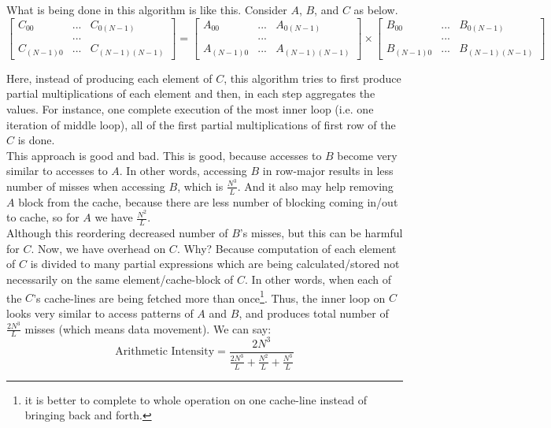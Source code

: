 \documentclass[paper=a4, fontsize=11pt]{scrartcl} %
\numberwithin{equation}{section} %
\numberwithin{figure}{section} %
\numberwithin{table}{section} %
\begin{document}
What is being done in this algorithm is like this. Consider $A$, $B$, and $C$ as below.
\begin{equation*}
\begin{bmatrix}
C_{00} & ... & C_{0(N-1)} \\
 &...&\\
C_{(N-1)0} & ... & C_{(N-1)(N-1)}
\end{bmatrix} = 
\begin{bmatrix}
A_{00} & ... & A_{0(N-1)} \\
 &...&\\
A_{(N-1)0} & ... & A_{(N-1)(N-1)}
\end{bmatrix} \times
\begin{bmatrix}
B_{00} & ... & B_{0(N-1)} \\
 &...&\\
B_{(N-1)0} & ... & B_{(N-1)(N-1)}
\end{bmatrix}
\end{equation*}

Here, instead of producing each element of $C$, this algorithm tries to first produce partial multiplications of each element and then, in each step aggregates the values. For instance, one complete execution of the most inner loop (i.e. one iteration of middle loop), all of the first partial multiplications of first row of the $C$ is done.\\
This approach is good and bad. This is good, because accesses to $B$ become very similar to accesses to $A$. In other words, accessing $B$ in row-major results in less number of misses when accessing $B$, which is $\frac{N^{3}}{L}$. And it also may help removing $A$ block from the cache, because there are less number of blocking coming in/out to cache, so for $A$ we have $\frac{N^{2}}{L}$.\\
Although this reordering decreased number of $B$'s misses, but this can be harmful for $C$. Now, we have overhead on $C$. Why? Because computation of each element of $C$ is divided to many partial expressions which are being calculated/stored not necessarily on the same element/cache-block of $C$. In other words, when each of the $C$'s cache-lines are being fetched more than once\footnote{it is better to complete to whole operation on one cache-line instead of bringing back and forth.}. Thus, the inner loop on $C$ looks very similar to access patterns of $A$ and $B$, and produces total number of $\frac{2N^{3}}{L}$ misses (which means data movement). We can say:
\begin{equation*}
\text{Arithmetic Intensity} = \frac{2N^{3}}{ \frac{2N^{3}}{L} + \frac{N^{2}}{L} + \frac{N^{3}}{L} }
\end{equation*}
\end{document}
